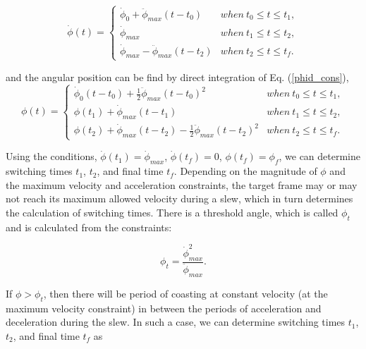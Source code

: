 \documentclass[journal ]{new-aiaa}
\begin{document}
	\begin{equation}\label{phid_cons}
	\dot{\phi}(t)=\left\{
	\begin{array}{ll}
	\dot{\phi}_0+\ddot{\phi}_{max}(t-t_0)& when\  t_0\leq t\leq t_1,\\
	\dot{\phi}_{max}& when\  t_1\leq t \leq t_2,\\
	\dot{\phi}_{max}-\ddot{\phi}_{max}(t-t_2)& when \ t_2\leq t\leq t_f.
	\end{array}
	\right.
	\end{equation}

and the angular position can be find by direct integration of Eq. (\ref{phid_cons}),
	\begin{equation}\label{phi_cons}
	\phi(t)=\left\{
	\begin{array}{ll}
	\dot{\phi}_0(t-t_0)+\frac{1}{2}\ddot{\phi}_{max}(t-t_0)^2& when\  t_0\leq t\leq t_1,\\
	\phi(t_1)+ \dot{\phi}_{max}(t-t_1)& when\  t_1\leq t \leq t_2,\\
	\phi(t_2)+\dot{\phi}_{max}(t-t_2)-\frac{1}{2}\ddot{\phi}_{max}(t-t_2)^2& when \ t_2\leq t\leq t_f.
	\end{array}
	\right.
	\end{equation}
	

Using the conditions, $\dot{\phi}(t_1)=\dot{\phi}_{max}$, $\dot{\phi}(t_f)=0$, $\phi(t_f)=\phi_f$, we can determine switching times $t_1$, $t_2$, and final time $t_f$. Depending on the magnitude of $\phi$ and the maximum velocity and acceleration constraints, the target frame may or may not reach its maximum allowed velocity during a slew, which in turn determines the calculation of switching times. There is a threshold angle, which is called $\phi_t$ and is calculated from the constraints: 

\begin{equation}\label{phi_t}
\phi_t = \frac{\dot{\phi}_{max}^2}{\ddot{\phi}_{max}}. 
\end{equation}

If $\phi > \phi_t$, then there will be period of coasting at constant velocity (at the maximum velocity constraint) in between the periods of acceleration and deceleration during the slew. In such a case, we can determine switching times $t_1$, $t_2$, and final time $t_f$ as
\end{document}
